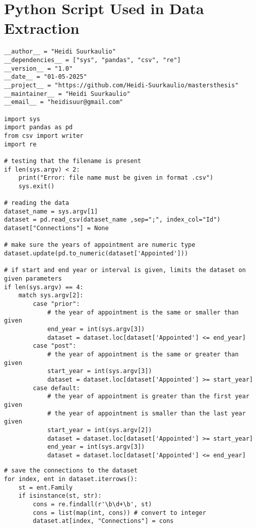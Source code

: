 \section{Python Script Used in Data Extraction}
\label{script}
\begin{small}
\begin{verbatim}
__author__ = "Heidi Suurkaulio"
__dependencies__ = ["sys", "pandas", "csv", "re"]
__version__ = "1.0"
__date__ = "01-05-2025"
__project__ = "https://github.com/Heidi-Suurkaulio/mastersthesis"
__maintainer__ = "Heidi Suurkaulio"
__email__ = "heidisuur@gmail.com"

import sys
import pandas as pd
from csv import writer
import re

# testing that the filename is present
if len(sys.argv) < 2:
    print("Error: file name must be given in format .csv")
    sys.exit()

# reading the data
dataset_name = sys.argv[1]
dataset = pd.read_csv(dataset_name ,sep=";", index_col="Id")
dataset["Connections"] = None

# make sure the years of appointment are numeric type
dataset.update(pd.to_numeric(dataset['Appointed']))

# if start and end year or interval is given, limits the dataset on given parameters
if len(sys.argv) == 4:
    match sys.argv[2]:
        case "prior":
            # the year of appointment is the same or smaller than given
            end_year = int(sys.argv[3])
            dataset = dataset.loc[dataset['Appointed'] <= end_year]
        case "post":
            # the year of appointment is the same or greater than given
            start_year = int(sys.argv[3])
            dataset = dataset.loc[dataset['Appointed'] >= start_year]
        case default:
            # the year of appointment is greater than the first year given
            # the year of appointment is smaller than the last year given
            start_year = int(sys.argv[2])
            dataset = dataset.loc[dataset['Appointed'] >= start_year]
            end_year = int(sys.argv[3])
            dataset = dataset.loc[dataset['Appointed'] <= end_year]       
\end{verbatim}
\pagebreak
\begin{verbatim}
# save the connections to the dataset
for index, ent in dataset.iterrows():
    st = ent.Family
    if isinstance(st, str):
        cons = re.findall(r'\b\d+\b', st)
        cons = list(map(int, cons)) # convert to integer
        dataset.at[index, "Connections"] = cons


\end{verbatim}
\end{small}
